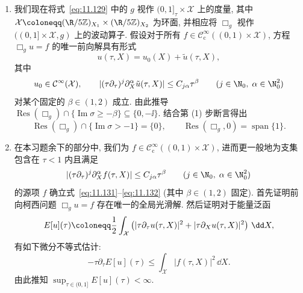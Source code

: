 \begin{exer}[标量波动算子的谐振]
\begin{enumerate}[label=(\arabic*)]
    \item 我们现在将式~\eqref{eq:11.129} 中的 $g$ 视作 $(0, 1]_\tau \times \mathcal{X}$ 上的度量, 其中 $\mathcal{X} \defeq (\R/5\mathbb{Z})_{X_1} \times (\R/5\mathbb{Z})_{X_2}$ 为环面, 并相应将 $\Box_g$ 视作 $((0, 1] \times \mathcal{X}, g)$ 上的波动算子. 假设对于所有 $f \in \mathcal{C}_{\mathrm{c}}^\infty((0, 1) \times \mathcal{X})$, 方程 $\Box_g u = f$ 的唯一前向解具有形式
    \begin{equation}\label{eq:11.131}
        u(\tau, X) = u_0(X) + \tilde u(\tau, X),
    \end{equation}
    其中
    \begin{equation}\label{eq:11.132}
        u_0 \in \mathcal{C}^\infty(\mathcal{X}), \qquad |(\tau \partial_\tau)^j \partial_X^\alpha \tilde u(\tau, X)| \le C_{j\alpha} \tau^\beta \qquad (j \in \N_0, \; \alpha \in \N_0^2)
    \end{equation}
    对某个固定的 $\beta \in (1, 2)$ 成立. 由此推导 $\operatorname{Res}(\Box_g) \cap \{\operatorname{Im}\sigma \ge -\beta\} \subseteq \{0, -\ii\}$. 结合第 (1) 步断言得出
    \begin{equation}\label{eq:11.133}
        \operatorname{Res}(\Box_g) \cap \{\operatorname{Im}\sigma > -1\} = \{0\}, \qquad \operatorname{Res}(\Box_g, 0) = \operatorname{span}\{1\}.
    \end{equation}
    \item 在本习题余下的部分中, 我们为 $f \in \mathcal{C}_{\mathrm{c}}^\infty((0, 1) \times \mathcal{X})$, 进而更一般地为支集包含在 $\tau < 1$ 内且满足
    \begin{equation}\label{eq:11.134}
        |(\tau \partial_\tau)^j \partial_X^\alpha f(\tau, X)| \le C_{j\alpha} \tau^\beta \qquad (j \in \N_0, \; \alpha \in \N_0^2)
    \end{equation}
    的源项 $f$ 确立式~\eqref{eq:11.131}--\eqref{eq:11.132} (其中 $\beta \in (1, 2)$ 固定). 首先证明前向柯西问题 $\Box_g u = f$ 存在唯一的全局光滑解. 然后证明对于能量泛函
    \begin{equation}\label{eq:11.135}
        E[u](\tau) \defeq \frac{1}{2} \int_{\mathcal{X}} \left( |\tau \partial_\tau u(\tau, X)|^2 + |\tau \partial_X u(\tau, X)|^2 \right) \,\dd X,
    \end{equation}
    有如下微分不等式估计:
    \begin{equation}\label{eq:11.136}
        -\tau \partial_\tau E[u](\tau) \le \int_{\mathcal{X}} |f(\tau, X)|^2 \,\dd X.
    \end{equation}
    由此推知 $\sup_{\tau \in (0, 1]} E[u](\tau) < \infty$.

\end{enumerate}
\end{exer}
